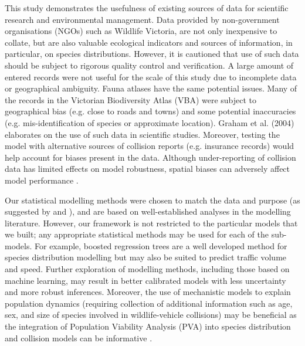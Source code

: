 This study demonstrates the usefulness of existing sources of data for scientific research and environmental management. Data provided by non-government organisations (NGOs) such as Wildlife Victoria, are not only inexpensive to collate, but are also valuable ecological indicators and sources of information, in particular, on species distributions. However, it is cautioned that use of such data should be subject to rigorous quality control and verification. A large amount of entered records were not useful for the scale of this study due to incomplete data or geographical ambiguity. Fauna atlases have the same potential issues. Many of the records in the Victorian Biodiversity Atlas (VBA) were subject to geographical bias (e.g. close to roads and towns) and some potential inaccuracies (e.g. mis-identification of species or approximate location). Graham et al. (2004) elaborates on the use of such data in scientific studies. Moreover, testing the model with alternative sources of collision reports (e.g. insurance records) would help account for biases present in the data. Although under-reporting of collision data has limited effects on model robustness, spatial biases can adversely affect model performance \citep{snow15}.

Our statistical modelling methods were chosen to match the data and purpose (as suggested by \cite{wint05} and \cite{guil15}), and are based on well-established analyses in the modelling literature. However, our framework is not restricted to the particular models that we built; any appropriate statistical methods may be used for each of the sub-models. For example, boosted regression trees are a well developed method for species distribution modelling \citep{elit08} but may also be suited to predict traffic volume and speed. Further exploration of modelling methods, including those based on machine learning, may result in better calibrated models with less uncertainty and more robust inferences. Moreover, the use of mechanistic models to explain population dynamics (requiring collection of additional information such as age, sex, and size of species involved in wildlife-vehicle collisions) may be beneficial as the integration of Population Viability Analysis (PVA) into species distribution and collision models can be informative \citep{tyre01,elit10,pola14}.

